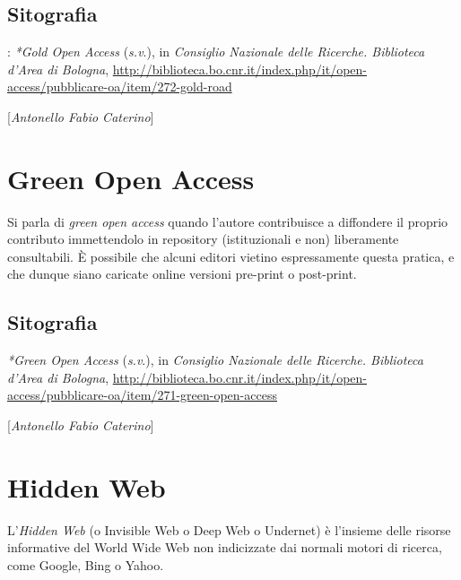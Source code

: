 {\section*{Sitografia}:
{\parindent0pt 
\emph{*Gold Open Access} (\emph{s.v}.), in \emph{Consiglio Nazionale
delle Ricerche. Biblioteca d'Area di Bologna},
\url{http://biblioteca.bo.cnr.it/index.php/it/open-access/pubblicare-oa/item/272-gold-road}
}

\hrulefill 

{[}\emph{Antonello Fabio Caterino}{]}



\chapter{Green Open Access}

Si parla di \emph{green open access} quando l'autore contribuisce a
diffondere il proprio contributo immettendolo in repository
(istituzionali e non) liberamente consultabili. È possibile che alcuni
editori vietino espressamente questa pratica, e che dunque siano
caricate online versioni pre-print o post-print.

\section*{Sitografia}
{\parindent0pt 
\emph{*Green Open Access} (\emph{s.v}.), in \emph{Consiglio Nazionale
delle Ricerche. Biblioteca d'Area di Bologna},
\url{http://biblioteca.bo.cnr.it/index.php/it/open-access/pubblicare-oa/item/271-green-open-access}
}

\hrulefill 

{[}\emph{Antonello Fabio Caterino}{]}

\chapter{Hidden Web}

L'\emph{Hidden Web} (o Invisible Web o Deep Web o Undernet) è l'insieme
delle risorse informative del World Wide Web non indicizzate dai normali
motori di ricerca, come Google, Bing o Yahoo.

}

